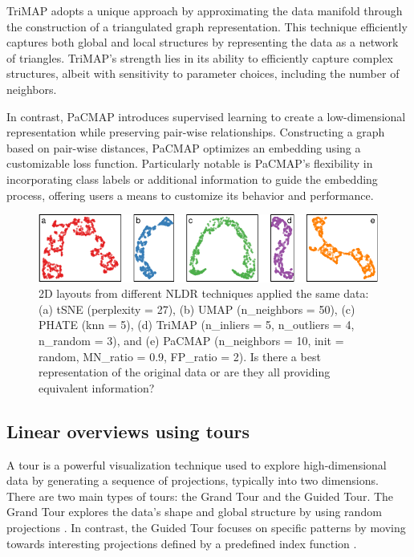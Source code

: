 \documentclass[
  12pt]{article}
\begin{document}
TriMAP adopts a unique approach by approximating the data manifold
through the construction of a triangulated graph representation. This
technique efficiently captures both global and local structures by
representing the data as a network of triangles. TriMAP's strength lies
in its ability to efficiently capture complex structures, albeit with
sensitivity to parameter choices, including the number of neighbors.

In contrast, PaCMAP introduces supervised learning to create a
low-dimensional representation while preserving pair-wise relationships.
Constructing a graph based on pair-wise distances, PaCMAP optimizes an
embedding using a customizable loss function. Particularly notable is
PaCMAP's flexibility in incorporating class labels or additional
information to guide the embedding process, offering users a means to
customize its behavior and performance.

\begin{figure}

{\centering \includegraphics[width=1\textwidth,height=\textheight]{paper_files/figure-pdf/fig-nldervis-1.pdf}

}

\caption{\label{fig-nldervis}2D layouts from different NLDR techniques
applied the same data: (a) tSNE (perplexity = 27), (b) UMAP
(n\_neighbors = 50), (c) PHATE (knn = 5), (d) TriMAP (n\_inliers = 5,
n\_outliers = 4, n\_random = 3), and (e) PaCMAP (n\_neighbors = 10, init
= random, MN\_ratio = 0.9, FP\_ratio = 2). Is there a best
representation of the original data or are they all providing equivalent
information?}

\end{figure}

\hypertarget{linear-overviews-using-tours}{%
\subsection{Linear overviews using
tours}\label{linear-overviews-using-tours}}

A tour is a powerful visualization technique used to explore
high-dimensional data by generating a sequence of projections, typically
into two dimensions. There are two main types of tours: the Grand Tour
and the Guided Tour. The Grand Tour explores the data's shape and global
structure by using random projections \citep{Asimov1985}. In contrast,
the Guided Tour focuses on specific patterns by moving towards
interesting projections defined by a predefined index function
\citep{article29}.
\end{document}
